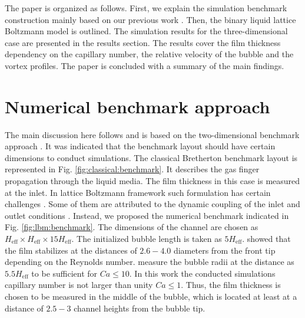 \documentclass{article}
\begin{document}
The paper is organized as follows.  First, we explain the simulation benchmark construction
mainly based on our previous work \cite{kuzmin-binary2d}. Then, the binary liquid lattice
Boltzmann model is outlined. The simulation results for the three-dimensional case are presented in
the results section. The results cover the film thickness dependency on the capillary number, the
relative velocity of the bubble and the vortex profiles. The paper
is concluded with a summary of the main findings.

\section{Numerical benchmark approach}
\label{sec:numerical:benchmark}
The main discussion here follows and is based on the two-dimensional benchmark approach
\cite{kuzmin-binary2d}. It was indicated that the benchmark layout should have certain
dimensions to conduct simulations. The classical Bretherton benchmark layout is represented in Fig.
\ref{fig:classical:benchmark}. It describes the gas finger propagation through the liquid media.
The film thickness in this case is measured at the inlet. In lattice Boltzmann framework such
formulation has certain challenges \cite{kuzmin-binary2d}. Some of them are attributed to the
dynamic coupling of the inlet and outlet conditions \cite{giavedoni-numerical}. Instead, we
proposed the numerical benchmark indicated in Fig. \ref{fig:lbm:benchmark}. The dimensions of the
channel are chosen as $H_{\mathrm{eff}}\times H_{\mathrm{eff}} \times 15 H_{\mathrm{eff}}$. The
initialized bubble length is taken as $5 H_{\mathrm{eff}}$. \citet{giavedoni-numerical} showed that
the film stabilizes at the distances of $2.6-4.0$ diameters
from the front tip depending on the Reynolds number. \citet{heil-threedim} measure the bubble radii at the distance as $5.5 H_{\mathrm{eff}}$ to be sufficient for $Ca\leq 10$. In this work the conducted simulations capillary number is not larger than unity $Ca\leq 1$.  Thus, the film thickness is chosen to be measured in the
middle of the bubble, which is located at least at a distance of $2.5-3$ channel heights from the 
bubble tip.%
\end{document}
